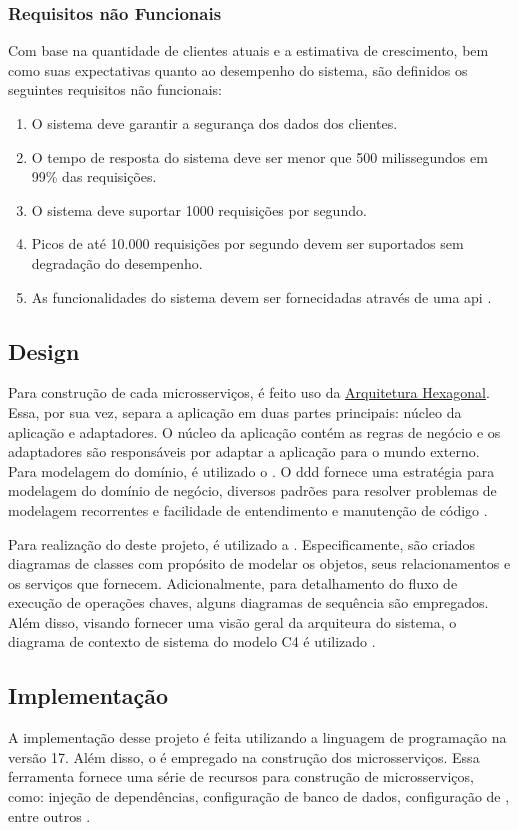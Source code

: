 \subsubsection{Requisitos não Funcionais}
Com base na quantidade de clientes atuais e a estimativa de crescimento, bem como suas expectativas quanto ao desempenho do sistema, são definidos os seguintes requisitos não funcionais:
\begin{enumerate}
    \item O sistema deve garantir a segurança dos dados dos clientes.
    \item O tempo de resposta do sistema deve ser menor que 500 milissegundos em 99\% das requisições.
    \item O sistema deve suportar 1000 requisições por segundo.
    \item Picos de até 10.000 requisições por segundo devem ser suportados sem degradação do desempenho.
    \item As funcionalidades do sistema devem ser fornecidadas através de uma \acrshort{api} .
\end{enumerate}

\subsection{Design}
Para construção de cada microsserviços, é feito uso da \hyperref[section:hexagonal]{Arquitetura Hexagonal}. Essa, por sua vez, separa a aplicação em duas partes principais: núcleo da aplicação e adaptadores. O núcleo da aplicação contém as regras de negócio e os adaptadores são responsáveis por adaptar a aplicação para o mundo externo. Para modelagem do domínio, é utilizado o . O \acrshort{ddd} fornece uma estratégia para modelagem do domínio de negócio, diversos padrões para resolver problemas de modelagem recorrentes e facilidade de entendimento e manutenção de código \cite{evans2004ddd}.

Para realização do  deste projeto, é utilizado a . Especificamente, são criados diagramas de classes com propósito de modelar os objetos, seus relacionamentos e os serviços que fornecem. Adicionalmente, para detalhamento do fluxo de execução de operações chaves, alguns diagramas de sequência são empregados. Além disso, visando fornecer uma visão geral da arquiteura do sistema, o diagrama de contexto de sistema do modelo C4 é utilizado \cite{c4Model}. 

\subsection{Implementação}
A implementação desse projeto é feita utilizando a linguagem de programação  na versão 17. Além disso, o  é empregado na construção dos microsserviços. Essa ferramenta fornece uma série de recursos para construção de microsserviços, como: injeção de dependências, configuração de banco de dados, configuração de , entre outros \cite{springBoot}. 

